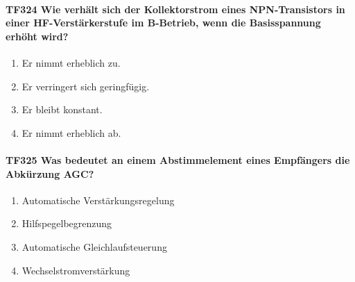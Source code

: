 \documentclass[8pt]{article}
\begin{document}
\paragraph*{TF324 Wie verhält sich der Kollektorstrom eines NPN-Transistors in einer HF-Verstärkerstufe im B-Betrieb, wenn die Basisspannung erhöht wird?}
\begin{enumerate}[nolistsep,label=\Alph*]
\item Er nimmt erheblich zu.
\item Er verringert sich geringfügig.
\item Er bleibt konstant.
\item Er nimmt erheblich ab.
\end{enumerate}

\paragraph*{TF325 Was bedeutet an einem Abstimmelement eines Empfängers die Abkürzung AGC?}
\begin{enumerate}[nolistsep,label=\Alph*]
\item Automatische Verstärkungsregelung
\item Hilfspegelbegrenzung
\item Automatische Gleichlaufsteuerung
\item Wechselstromverstärkung
\end{enumerate}
 
\end{document}
